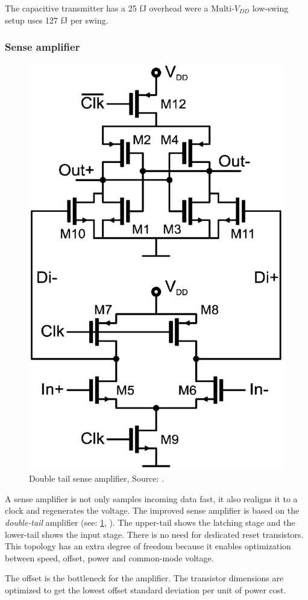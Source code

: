 The capacitive transmitter has a 25 fJ overhead were a Multi-$V_{DD}$ low-swing setup uses 127 fJ per swing.



\subsubsection{Sense amplifier} \label{sss:rep2:senseamp} %

\begin{figure}	\centering
	
	\includegraphics[width=0.6\linewidth]{Figures/Rep2DoubleTail.png}
	\caption{Double tail sense amplifier, Source: \cite{schinkel2009low}.} 
    \label{fig:rep2:doubletail}
\end{figure}

A sense amplifier is not only samples incoming data fast, it also realigns it to a clock and regenerates the voltage.
The improved sense amplifier is based on the \textit{double-tail} amplifier (see: \cref{fig:rep2:doubletail}, \cite{schinkel2007double}).
The upper-tail shows the latching stage and the lower-tail shows the input stage.
There is no need for dedicated reset transistors.
This topology has an extra degree of freedom because it enables optimization between speed, offset, power and common-mode voltage.

The offset is the bottleneck for the amplifier.
The transistor dimensions are optimized to get the lowest offset standard deviation per unit of power cost.

